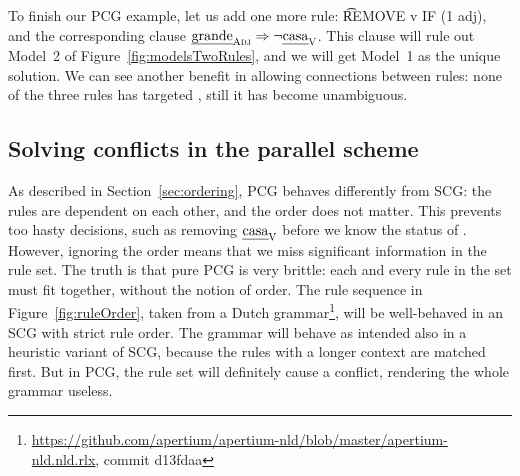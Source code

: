 To finish our PCG example, let us add one more rule: \t{REMOVE v IF (1 adj)}, and the corresponding clause $\text{\em grande}_{\text{\sc Adj}} \Rightarrow \neg \text{\em casa}_{\text{\sc V}}$. This clause will rule out Model~2 of Figure~\ref{fig:modelsTwoRules}, and we will get Model~1 as the unique solution.
We can see another benefit in allowing connections between rules: none of the three rules has targeted \la{}, still it has become unambiguous.





\subsection{Solving conflicts in the parallel scheme}
\label{sec:parallelScheme}

As described in Section~\ref{sec:ordering}, PCG behaves differently
from SCG: the rules are dependent on each other, and the order does
not matter.  This prevents too hasty decisions, such as removing
$\text{\em casa}_{\text{\sc V}}$ before we know the status of \la{}.  However, ignoring the
order means that we miss significant information in the rule set.  The
truth is that pure PCG is very brittle: each and every rule in the set
must fit together, without the notion of order. The rule sequence in
Figure~\ref{fig:ruleOrder}, taken from a Dutch
grammar\footnote{\url{https://github.com/apertium/apertium-nld/blob/master/apertium-nld.nld.rlx}, commit d13fdaa},
will be well-behaved in an SCG with strict rule order.  The grammar
will behave as intended also in a heuristic variant of SCG, because
the rules with a longer context are matched first.  But in PCG, the
rule set will definitely cause a conflict, rendering the whole grammar
useless.



